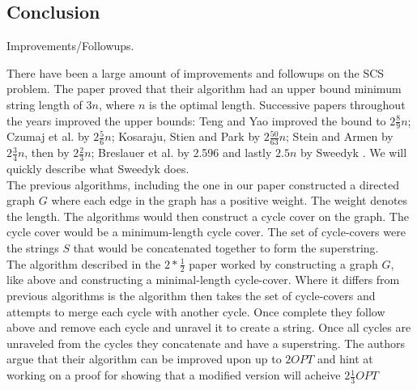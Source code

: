 \documentclass[letterpaper,11pt,titlepage]{article}
\begin{document}
\subsection{Conclusion}

Improvements/Followups.


There have been a large amount of improvements and followups on the SCS problem. The paper proved that their algorithm had an upper bound minimum string length of $3n$, where $n$ is the optimal length. Successive papers throughout the years improved the upper bounds: Teng and Yao improved the bound to $2 \frac{8}{9} n$; Czumaj et al. by $2 \frac{5}{6} n$; Kosaraju, Stien and Park by $2 \frac{50}{63} n$; Stein and Armen by $2 \frac{3}{4} n$, then by $2 \frac{2}{3} n$; Breslauer et al. by 2.596 and lastly $2.5 n$ by Sweedyk \cite{sweedyk2000boldmath}. We will quickly describe what Sweedyk does.\\

The previous algorithms, including the one in our paper constructed a directed graph $G$ where each edge in the graph has a positive weight. The weight denotes the length. The algorithms would then construct a cycle cover on the graph. The cycle cover would be a minimum-length cycle cover. The set of cycle-covers were the strings $S$ that would be concatenated together to form the superstring.\\

The algorithm described in the $2*\frac{1}{2}$ paper worked by constructing a graph $G$, like above and constructing a minimal-length cycle-cover. Where it differs from previous algorithms is the algorithm then takes the set of cycle-covers and attempts to merge each cycle with another cycle. Once complete they follow above and remove each cycle and unravel it to create a string. Once all cycles are unraveled from the cycles they concatenate and have a superstring. The authors argue that their algorithm can be improved upon up to $2OPT$ and hint at working on a proof for showing that a modified version will acheive $2\frac{1}{3} OPT$\\

\newpage

{
  \small 
  
  
}
\end{document}
